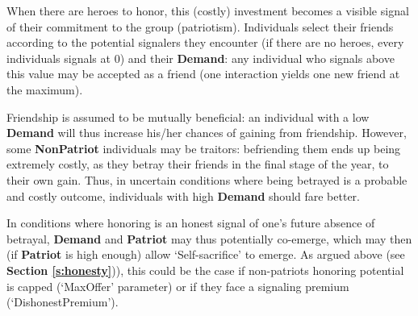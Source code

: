 \documentclass[a4paper,12pt]{report}
\begin{document}
When there are heroes to honor, this (costly) investment becomes a
visible signal of their commitment to the group (patriotism).
Individuals select their friends according to the potential
signalers they encounter (if there are no heroes, every individuals
signals at 0) and their \textbf{Demand}: any individual who signals above this
value may be accepted as a friend (one interaction yields one new friend at the maximum).

Friendship is assumed to be mutually beneficial:
an individual with a low \textbf{Demand}
will thus increase his/her chances of gaining from friendship.
However, some \textbf{NonPatriot} individuals may be traitors:
befriending them ends up being extremely costly, as they betray their friends
in the final stage of the year, to their own gain.
Thus, in uncertain conditions where being betrayed is a probable and costly outcome,
individuals with high \textbf{Demand} should fare better.

In conditions where honoring is an honest signal of one’s
future absence of betrayal, \textbf{Demand} and \textbf{Patriot}
may thus potentially co-emerge, which may then (if \textbf{Patriot} is high enough)
allow ‘Self-sacrifice’ to emerge. As argued above (see \textbf{Section \ref{s:honesty}})),
this could be the case if non-patriots honoring potential is capped
(‘MaxOffer’ parameter) or if they face a signaling premium (‘DishonestPremium’).

\end{document}
